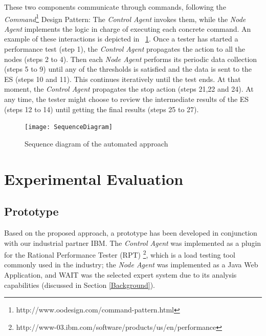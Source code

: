 \documentclass[runningheads,a4paper]{llncs}
\begin{document}
These two components communicate through commands, following the
\emph{Command}\footnote{http://www.oodesign.com/command-pattern.html} Design
Pattern: The \emph{Control Agent} invokes them, while the \emph{Node Agent}
implements the logic in charge of executing each concrete command. An example of
these interactions is depicted in \figurename ~\ref{fig_SeqDiagram}. Once a
tester has started a performance test (step 1), the \emph{Control Agent}
propagates the action to all the nodes (steps 2 to 4). Then each \emph{Node
Agent} performs its periodic data collection (steps 5 to 9) until any of the
thresholds is satisfied and the data is sent to the ES (steps 10 and 11). This
continues iteratively until the test ends. At that moment, the \emph{Control Agent} 
propagates the stop action (steps 21,22 and 24). At any time, the tester might
choose to review the intermediate results of the ES (steps 12 to 14) until
getting the final results (steps 25 to 27).

\begin{figure}[!h]
\centering
\texttt{[image: SequenceDiagram]}
\caption{Sequence diagram of the automated approach}
\label{fig_SeqDiagram}
\end{figure}

\vspace{-7pt}
\section{Experimental Evaluation}
\label{ExperimentalEvaluation}


\vspace{-7pt}
\subsection{Prototype}
\vspace{-7pt}
Based on the proposed approach, a prototype has been developed
in conjunction with our industrial partner IBM. The \emph{Control Agent} was
implemented as a plugin for the Rational Performance Tester (RPT)
\footnote{http://www-03.ibm.com/software/products/us/en/performance}, which is a
load testing tool commonly used in the industry; the \emph{Node Agent} was
implemented as a Java Web Application, and WAIT was the selected expert system
due to its analysis capabilities (discussed in Section \ref{Background}).
\end{document}
